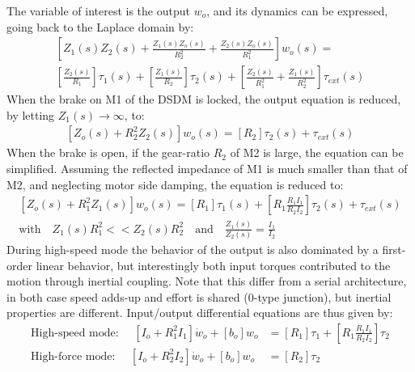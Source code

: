 The variable of interest is the output $w_o$, and its dynamics can be expressed, going back to the Laplace domain by:
%
\begin{align}
\left[
 Z_1(s) Z_2(s) + \frac{Z_1(s) Z_o(s)}{R_2^2} + \frac{Z_2(s) Z_o(s)}{R_1^2}
\right] w_o(s) = \\
\left[
 \frac{Z_2(s)}{R_1}
\right] \tau_1(s)  + 
\left[
 \frac{Z_1(s)}{R_2}
\right] \tau_2(s)  + 
\left[
 \frac{Z_2(s)}{R_1^2} + \frac{Z_1(s) }{R_2^2}
\right] \tau_{ext}(s)
\label{eq:dsdm_output}
\end{align}
%
When the brake on M1 of the DSDM is locked, the output equation is reduced, by letting $Z_1(s) \rightarrow \infty$, to:
%
\begin{align}
\left[
 Z_o(s)  + R_2^2 Z_2(s)
\right] w_o(s) = 
\left[
R_2
\right] \tau_2(s)  + 
\tau_{ext}(s)
\label{eq:dsdm_output_HF}
\end{align}
%
When the brake is open, if the gear-ratio $R_2$ of M2 is large, the equation can be simplified. 
%
%
Assuming the reflected impedance of M1 is much smaller than that of M2, and neglecting motor side damping, the equation is reduced to:
%
\begin{align}
\left[
Z_o(s)  + R_1^2 Z_1(s)
\right] w_o(s) = 
\left[
R_1
\right] \tau_1(s)  + 
\left[
R_1 \frac{R_1 I_1}{R_2 I_2}
\right] \tau_2(s)  + 
\tau_{ext}(s) \\
\text{with} \quad Z_1(s) R_1^2 << Z_2(s) R_2^2 
\quad \text{and} \quad \frac{Z_1(s)}{Z_2(s)} = \frac{I_1}{I_2}
\label{eq:dsdm_output_HS}
\end{align}
%
During high-speed mode the behavior of the output is also dominated by a first-order linear behavior, but interestingly both input torques contributed to the motion through inertial coupling. Note that this differ from a serial architecture, in both case speed adds-up and effort is shared (0-type junction), but inertial properties are different. Input/output differential equations are thus given by:
%
\begin{align}
\text{High-speed mode: } \quad \left[ I_o + R_1^2 I_1 \right] \dot{w}_o +  \left[ b_o \right] w_o  &= \left[ R_1 \right] \tau_1 + \left[ R_1 \frac{R_1 I_1}{R_2 I_2} \right] \tau_2 
\label{eq:dsdm_output_HSw0} \\
\text{High-force mode: } \quad \left[ I_o + R_2^2 I_2 \right] \dot{w}_o +  \left[ b_o \right] w_o  &= \left[ R_2 \right] \tau_2 
\label{eq:dsdm_output_HFw0}
\end{align}
